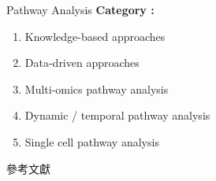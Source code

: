 \documentclass[12pt, aspectratio=43]{beamer}
\begin{document}
	\begin{frame}{Pathway Analysis}
		\textbf{Category :}
		\begin{enumerate}
			\item Knowledge-based approaches
			\item Data-driven approaches
			\item Multi-omics pathway analysis
			\item Dynamic / temporal pathway analysis
			\item Single cell pathway analysis
		\end{enumerate}
	\end{frame}
	
	
	\begin{frame}[allowframebreaks]{參考文獻}
	    \printbibliography %
	\end{frame}
\end{document}
